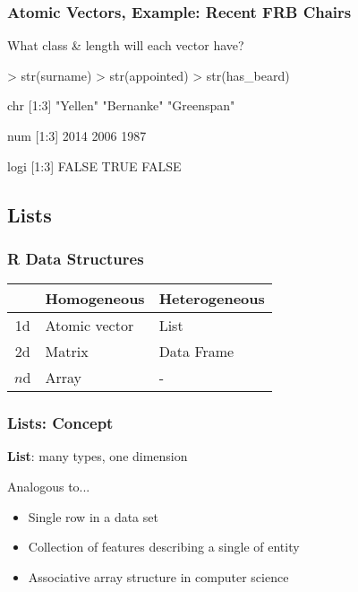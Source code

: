 \documentclass{beamer}
\begin{document}
\begin{frame}[fragile]
\frametitle{Atomic Vectors, Example: Recent FRB Chairs}

What class \& length will each vector have?
\begin{Schunk}
\begin{Sinput}
> str(surname)
> str(appointed)
> str(has_beard)
\end{Sinput}
\end{Schunk}
\pause
\begin{Schunk}
\begin{Soutput}
 chr [1:3] "Yellen" "Bernanke" "Greenspan"
\end{Soutput}
\begin{Soutput}
 num [1:3] 2014 2006 1987
\end{Soutput}
\begin{Soutput}
 logi [1:3] FALSE TRUE FALSE
\end{Soutput}
\end{Schunk}
\end{frame}



\subsection{Lists}


\begin{frame}
\frametitle{R Data Structures}

\begin{table}
\begin{tabular}{c|ll}
   &  Homogeneous   & Heterogeneous \\ \hline
1d & Atomic vector &  \cellcolor{gray!25} List \\
2d & Matrix        & Data Frame \\
$n$d & Array       & - \\ 
\end{tabular}
\end{table}

\end{frame}



\begin{frame}[fragile]
\frametitle{Lists: Concept}

\textbf{List}: many types, one dimension
\pause

Analogous to...
\begin{itemize}
\item<1-> Single row in a data set
\item<1-> Collection of features describing a single of entity
\item<1-> Associative array structure in computer science
\end{itemize}

\end{frame}
\end{document}
